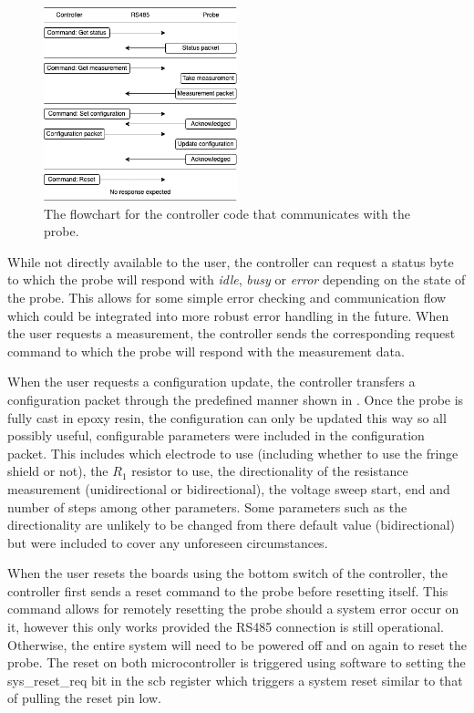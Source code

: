 \begin{figure}[h]
    \centering
    \includegraphics[width=0.5\textwidth]{Figures/rs485_flowchart}
    \caption{The flowchart for the controller code that communicates with the probe.}
    \label{fig:rs485-flowchart} %
\end{figure}

While not directly available to the user, the controller can request a status byte to which the probe will respond with \textit{idle}, \textit{busy} or \textit{error} depending on the state of the probe.
This allows for some simple error checking and communication flow which could be integrated into more robust error handling in the future.
When the user requests a measurement, the controller sends the corresponding request command to which the probe will respond with the measurement data.

When the user requests a configuration update, the controller transfers a configuration packet through the predefined manner shown in .
Once the probe is fully cast in epoxy resin, the configuration can only be updated this way so all possibly useful, configurable parameters were included in the configuration packet.
This includes which electrode to use (including whether to use the fringe shield or not), the $R_1$ resistor to use, the directionality of the resistance measurement (unidirectional or bidirectional), the voltage sweep start, end and number of steps among other parameters.
Some parameters such as the directionality are unlikely to be changed from there default value (bidirectional) but were included to cover any unforeseen circumstances.

When the user resets the boards using the bottom switch of the controller, the controller first sends a reset command to the probe before resetting itself.
This command allows for remotely resetting the probe should a system error occur on it, however this only works provided the RS485 connection is still operational.
Otherwise, the entire system will need to be powered off and on again to reset the probe.
The reset on both microcontroller is triggered using software to setting the \gls{sys_reset_req} bit in the \gls{scb} register which triggers a system reset similar to that of pulling the reset pin low.